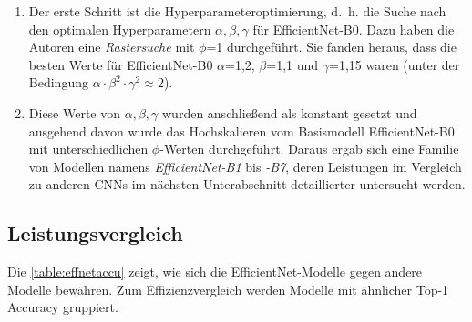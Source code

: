 \begin{enumerate}
	\item Der erste Schritt ist die Hyperparameteroptimierung, d.~h. die Suche nach den optimalen Hyperparametern $\alpha, \beta, \gamma$ für EfficientNet-B0. Dazu haben die Autoren eine \emph{Rastersuche} mit $\phi$=1 durchgeführt. Sie fanden heraus, dass die besten Werte für EfficientNet-B0 $\alpha$=1,2, $\beta$=1,1 und $\gamma$=1,15 waren (unter der Bedingung $\alpha\cdot\beta^2\cdot\gamma^2 \approx 2$).
	
	\item Diese Werte von $\alpha, \beta, \gamma$ wurden anschließend als konstant gesetzt und ausgehend davon wurde das Hochskalieren vom Basismodell EfficientNet-B0 mit unterschiedlichen $\phi$-Werten durchgeführt. Daraus ergab sich eine Familie von Modellen namens \emph{EfficientNet-B1} bis \emph{-B7}, deren Leistungen im Vergleich zu anderen CNNs im nächsten Unterabschnitt detaillierter untersucht werden.
\end{enumerate}

\subsection{Leistungsvergleich}

Die \autoref{table:effnetaccu} zeigt, wie sich die EfficientNet-Modelle gegen andere Modelle bewähren. Zum Effizienzvergleich werden Modelle mit ähnlicher Top-1 Accuracy gruppiert. 

